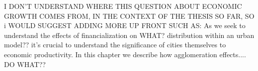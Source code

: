 


I DON'T UNDERSTAND WHERE THIS QUESTION ABOUT ECONOMIC GROWTH COMES FROM, IN THE CONTEXT OF THE THESIS SO FAR,  SO i WOULD SUGGEST ADDING MORE UP FRONT SUCH AS: As we seek to understand the effects of financialization on WHAT? distribution within an urban model?? it's crucial to understand the significance of cities themselves to economic productivity. In this chapter we describe how agglomeration effects.... DO WHAT??

